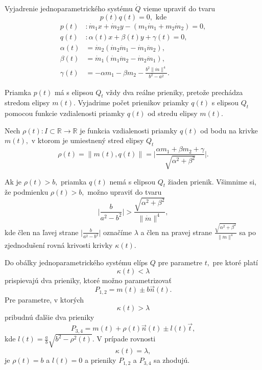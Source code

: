 Vyjadrenie jednoparametrického systému $\dot{Q}$ vieme upraviť do tvaru $$ p(t)q(t) = 0, \text{ kde} $$
\begin{align*}
p(t) &\colon \dot{m}_1 x + \dot{m}_2 y - (m_1 \dot{m}_1 + m_2 \dot{m}_2) = 0, \\
q(t) &\colon  \alpha(t) x + \beta(t) y +  \gamma(t) = 0, \\
\alpha (t) &= \dot{m}_2(\dot{m}_2 \ddot{m}_1 - \dot{m}_1 \ddot{m}_2) , \\
\beta (t) &= \dot{m}_1 (\dot{m}_1 \ddot{m}_2 - \dot{m}_2 \ddot{m}_1) , \\
\gamma (t) &= -\alpha m_1 - \beta m_2 - \frac{b^2 \| \dot{m} \|^4 }{b^2 - a^2}.
\end{align*}

Priamka $p(t)$ má s elipsou $Q_t$ vždy dva reálne prieniky, pretože prechádza stredom elipsy $m(t)$. Vyjadrime počet prienikov priamky $q(t)$ s elipsou $Q_t$ pomocou funkcie vzdialenosti priamky $q(t)$ od stredu elipsy $m(t).$

Nech $\rho(t) \colon I \subset \mathbb{R} \rightarrow \mathbb{R}$ je funkcia vzdialenosti priamky $q(t)$ od bodu na krivke $m(t),$ v ktorom je umiestnený stred elipsy $Q_t$
$$
\rho (t) = \| m(t), q(t) \|= \bigg|  \frac{\alpha m_1 + \beta m_2 + \gamma}{\sqrt{\alpha^2 + \beta^2}} \bigg|.
$$

Ak je $\rho(t) > b,$ priamka $q(t)$ nemá s elipsou  $Q_t$ žiaden prienik. Všimnime si, že podmienku $\rho(t) > b,$ možno upraviť do tvaru
$$
\bigg|  \frac{b}{a^2 - b^2} \bigg| > \frac{\sqrt{\alpha^2 + \beta^2}}{\| \dot{m} \|^4},
$$
kde člen na ľavej strane $\big| \frac{b}{a^2 - b^2} \big|$ označíme $\lambda$ a člen na pravej strane $\frac{\sqrt{\alpha^2 + \beta^2}}{\| \dot{m} \|^4} $ sa po zjednodušení rovná krivosti krivky $\kappa(t).$

Do obálky jednoparametrického systému elíps $Q$ pre parametre $t,$ pre ktoré platí 
$$
\kappa(t) < \lambda
$$
prispievajú dva prieniky, ktoré možno parametrizovať
$$P_{1,2}= m(t)\pm b \vec{n}(t).$$
Pre parametre, v ktorých
$$
\kappa(t) > \lambda
$$
pribudnú ďalšie dva prieniky
$$
P_{3,4} = m(t) + \rho(t) \vec{n}(t) \pm l(t) \vec{t},$$
kde $l(t)=\frac{a}{b} \sqrt{b^2 - \rho^2(t)}.$
V prípade rovnosti
$$
\kappa(t) = \lambda,
$$
je $\rho(t) = b$ a $l(t) = 0$  a prieniky $P_{1,2}$ a $P_{3,4}$ sa zhodujú.

